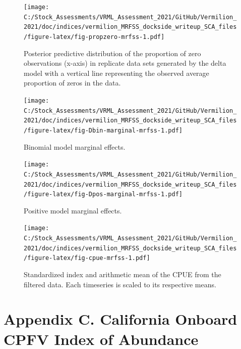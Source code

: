 \documentclass[11pt,
  english,
]{article}
\begin{document}
\begin{figure}
\centering
\texttt{[image: C:/Stock\_Assessments/VRML\_Assessment\_2021/GitHub/Vermilion\_2021/doc/indices/vermilion\_MRFSS\_dockside\_writeup\_SCA\_files/figure-latex/fig-propzero-mrfss-1.pdf]}
\caption{\label{fig:fig-propzero-mrfss}Posterior predictive distribution of the proportion of zero observations (x-axis) in replicate data sets generated by the delta model with a vertical line representing the observed average proportion of zeros in the data.}
\end{figure}

\FloatBarrier

\begin{figure}
\centering
\texttt{[image: C:/Stock\_Assessments/VRML\_Assessment\_2021/GitHub/Vermilion\_2021/doc/indices/vermilion\_MRFSS\_dockside\_writeup\_SCA\_files/figure-latex/fig-Dbin-marginal-mrfss-1.pdf]}
\caption{\label{fig:fig-Dbin-marginal-mrfss}Binomial model marginal effects.}
\end{figure}

\begin{figure}
\centering
\texttt{[image: C:/Stock\_Assessments/VRML\_Assessment\_2021/GitHub/Vermilion\_2021/doc/indices/vermilion\_MRFSS\_dockside\_writeup\_SCA\_files/figure-latex/fig-Dpos-marginal-mrfss-1.pdf]}
\caption{\label{fig:fig-Dpos-marginal-mrfss}Positive model marginal effects.}
\end{figure}

\begin{figure}
\centering
\texttt{[image: C:/Stock\_Assessments/VRML\_Assessment\_2021/GitHub/Vermilion\_2021/doc/indices/vermilion\_MRFSS\_dockside\_writeup\_SCA\_files/figure-latex/fig-cpue-mrfss-1.pdf]}
\caption{\label{fig:fig-cpue-mrfss}Standardized index and arithmetic mean of the CPUE from the filtered data. Each timeseries is scaled to its respective means.}
\end{figure}

\newpage


\hypertarget{appendix-c.-california-onboard-cpfv-index-of-abundance}{%
\section*{Appendix C. California Onboard CPFV Index of Abundance}\label{appendix-c.-california-onboard-cpfv-index-of-abundance}}
\end{document}
